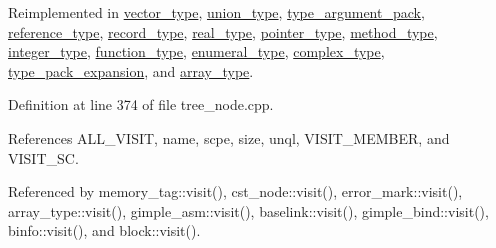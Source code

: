 Reimplemented in \hyperlink{structvector__type_a628f2913374a823ed425afdd76197459}{vector\+\_\+type}, \hyperlink{structunion__type_a6a6db754840c90dd94a29478df279e7b}{union\+\_\+type}, \hyperlink{structtype__argument__pack_a1367b4b509c18a5ba865cccc463d6172}{type\+\_\+argument\+\_\+pack}, \hyperlink{structreference__type_aa5b63ca7df3884098382105ee8c1e128}{reference\+\_\+type}, \hyperlink{structrecord__type_a4ae646f9bc555d547c8b04a89de4135a}{record\+\_\+type}, \hyperlink{structreal__type_a9f45291aa61c33e2abba3618ce224dc3}{real\+\_\+type}, \hyperlink{structpointer__type_aa2f2890548ddc7599a180a59c1635c93}{pointer\+\_\+type}, \hyperlink{structmethod__type_a5994c05dca057b061c979293c5895c41}{method\+\_\+type}, \hyperlink{structinteger__type_af6ef21cdf33588b79656e930c2444987}{integer\+\_\+type}, \hyperlink{structfunction__type_a7cfe2e272e5280c9c280b180e3a21c2b}{function\+\_\+type}, \hyperlink{structenumeral__type_ab9c53d590b11d386a0791a0b211a5b1f}{enumeral\+\_\+type}, \hyperlink{structcomplex__type_a22e4557b10d89aad537a1d213bf5eafd}{complex\+\_\+type}, \hyperlink{structtype__pack__expansion_a29598e1fd00fefa43588b8b30c8a6675}{type\+\_\+pack\+\_\+expansion}, and \hyperlink{structarray__type_af389e234db3595ab54f93b6656600756}{array\+\_\+type}.



Definition at line 374 of file tree\+\_\+node.\+cpp.



References A\+L\+L\+\_\+\+V\+I\+S\+IT, name, scpe, size, unql, V\+I\+S\+I\+T\+\_\+\+M\+E\+M\+B\+ER, and V\+I\+S\+I\+T\+\_\+\+SC.



Referenced by memory\+\_\+tag\+::visit(), cst\+\_\+node\+::visit(), error\+\_\+mark\+::visit(), array\+\_\+type\+::visit(), gimple\+\_\+asm\+::visit(), baselink\+::visit(), gimple\+\_\+bind\+::visit(), binfo\+::visit(), and block\+::visit().

